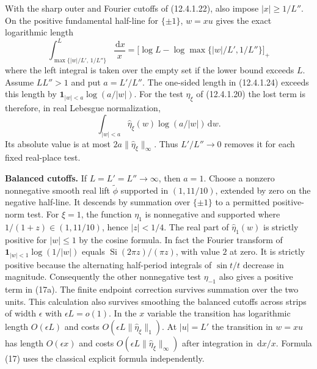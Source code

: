 \documentclass[11pt,letterpaper]{article}
\newcommand{\point}[1]{\par\smallskip\textbf{#1.}\enspace\ignorespaces}
\newcommand{\dd}{\,\mathrm d}
\begin{document}
With the sharp outer and Fourier cutoffs of (12.4.1.22), also impose
$|x|\ge1/L''$. On the positive fundamental half-line for $\{\pm1\}$,
$w=xu$ gives the exact logarithmic length
\[
 \int_{\max\{|w|/L',\,1/L''\}}^{L}\frac{\dd x}{x}
    =\big[\log L-\log\max\{|w|/L',1/L''\}\big]_+
\]
where the left integral is taken over the empty set if the lower bound
exceeds $L$. Assume $LL''>1$ and put $a=L'/L''$. The one-sided length
in (12.4.1.24) exceeds this length by $\mathbf1_{|w|<a}\log(a/|w|)$.
For the test $\eta_\xi$ of (12.4.1.20) the lost term is therefore,
in real Lebesgue normalization,
\[
       \int_{|w|<a}\widehat\eta_\xi(w)\log(a/|w|)\dd w .
 \tag{17a}
\]
Its absolute value is at most $2a\|\widehat\eta_\xi\|_\infty$. Thus
$L'/L''\to0$ removes it for each fixed real-place test.

\point{Balanced cutoffs} If $L=L'=L''\to\infty$, then $a=1$. Choose a
nonzero nonnegative smooth real lift $\widetilde\phi$ supported in
$(1,11/10)$, extended by zero on the negative half-line. It descends by
summation over $\{\pm1\}$ to a permitted positive-norm test.
For $\xi=1$, the function $\eta_1$ is nonnegative and supported where
$1/(1+z)\in(1,11/10)$, hence $|z|<1/4$. The real part of
$\widehat\eta_1(w)$ is strictly positive for $|w|\le1$ by the cosine
formula. In fact the Fourier transform of
$\mathbf1_{|w|<1}\log(1/|w|)$ equals
$\operatorname{Si}(2\pi z)/(\pi z)$, with value $2$ at zero.
It is strictly positive because the alternating half-period integrals of
$\sin t/t$ decrease in magnitude. Consequently the other nonnegative
test $\eta_{-1}$ also gives a positive term in (17a). The finite endpoint
correction survives summation over the two units. This calculation
also survives smoothing the balanced cutoffs across strips of width
$\epsilon$ with $\epsilon L=o(1)$. In the $x$ variable the transition
has logarithmic length $O(\epsilon L)$ and costs
$O(\epsilon L\|\widehat\eta_\xi\|_1)$. At $|u|=L'$ the transition in
$w=xu$ has length $O(\epsilon x)$ and costs
$O(\epsilon L\|\widehat\eta_\xi\|_\infty)$ after integration in
$\dd x/x$. Formula (17) uses the classical explicit formula independently.
\end{document}
